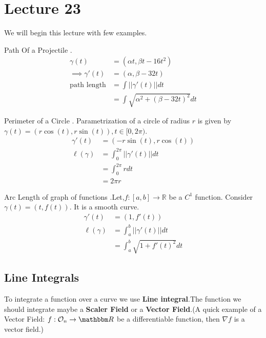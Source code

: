 \documentclass[Analysis-3]{subfiles}
\begin{document}
\chapter*{Lecture 23} %
\setcounter{chapter}{23} %
\setcounter{section}{0}
We will begin this lecture with few examples.
\begin{Eg}{Path Of a Projectile}
    . \begin{align*}
        \gamma(t)&=(\alpha t,\beta t-16t^2)\\
        \implies \gamma'(t) &= (\alpha ,\beta -32t)\\
        \text{path length} &= \int||\gamma'(t)|| dt \\
        &= \int \sqrt{\alpha^2 +(\beta-32t)^2} dt
      \end{align*}
\end{Eg}

\begin{Eg}{Perimeter of a Circle}
 . Parametrization of a circle of radius $r$ is given by $\gamma(t) = (r\cos(t),r\sin(t)), t \in [0,2\pi)$.
 \begin{align*}
    \gamma'(t) &= (-r\sin(t),r\cos(t)) \\
    \ell (\gamma) &= \int_{0}^{2\pi} ||\gamma'(t)|| dt \\
    &= \int_{0}^{2\pi} r dt \\
    &= 2\pi r 
 \end{align*}
\end{Eg}

\begin{Eg}{Arc Length of graph of functions}
    .Let,$f : [a,b]\to \mathbb{R}$ be a $C^1$ function. Consider $\gamma(t)=(t,f(t))$. It is a smooth curve.
    \begin{align*}
        \gamma'(t) &= (1,f'(t)) \\
     \ell (\gamma) &= \int_{a}^{b} ||\gamma'(t)|| dt \\
     &= \int_{a}^{b} \sqrt{1 + f'(t)^2} dt
    \end{align*}
\end{Eg}

\section{Line Integrals}
To integrate a function over a curve we use \textbf{Line integral}.The function we should integrate maybe a \textbf{Scaler Field} or a \textbf{Vector Field}.(A quick example of a Vector Field: $f : \mathcal{O}_n \to \R$ be a differentiable function, then $\nabla f$ is a vector field.)
\end{document}
